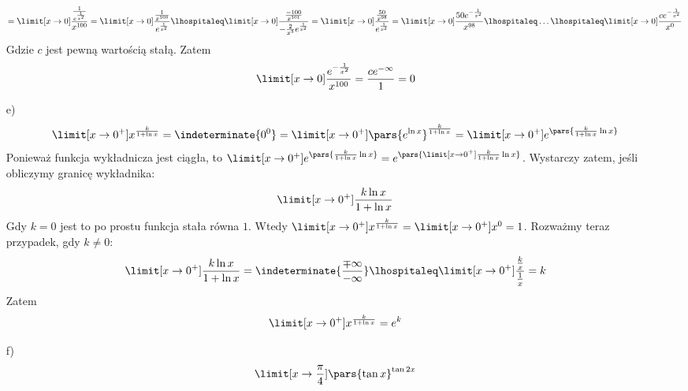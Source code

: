\begin{itemize}
\begin{equation*}
                = \limit[x \to 0] \frac{\frac{1}{e^{\frac{1}{x^2}}}}{x^{100}}
                = \limit[x \to 0] \frac{\frac{1}{x^{100}}}{e^{\frac{1}{x^2}}}
                \lhospitaleq \limit[x \to 0] \frac{\frac{-100}{x^{101}}}{-\frac{2}{x^3}e^{\frac{1}{x^2}}}
                = \limit[x \to 0] \frac{\frac{50}{x^{98}}}{e^{\frac{1}{x^2}}}
                = \limit[x \to 0] \frac{50e^{-\frac{1}{x^2}}}{x^{98}}
                \lhospitaleq \ldots
                \lhospitaleq \limit[x \to 0] \frac{ce^{-\frac{1}{x^2}}}{x^0}
        \end{equation*}
        Gdzie \(c\) jest pewną wartością stałą. Zatem
        \begin{equation*}
            \limit[x \to 0] \frac{e^{-\frac{1}{x^2}}}{x^{100}} = \frac{ce^{-\infty}}{1} = 0
        \end{equation*}
    \item[e)]
        \begin{equation*}
            \limit[x \to 0^+] x^{\frac{k}{1 + \ln x}}
                = \indeterminate{0^0}
                = \limit[x \to 0^+] \pars{e^{\ln x}}^{\frac{k}{1 + \ln x}}
                = \limit[x \to 0^+] e^{\pars{\frac{k}{1 + \ln x}\ln x}}
        \end{equation*}
        Ponieważ funkcja wykładnicza jest ciągła, to \(\limit[x \to 0^+] e^{\pars{\frac{k}{1 + \ln x}\ln x}} = e^{\pars{\limit[x \to 0^+] \frac{k}{1 + \ln x}\ln x}}\). Wystarczy zatem, jeśli obliczymy granicę wykładnika:
        \begin{equation*}
            \limit[x \to 0^+] \frac{k\ln x}{1 + \ln x}
        \end{equation*}
        Gdy \(k = 0\) jest to po prostu funkcja stała równa \(1\). Wtedy \(\limit[x \to 0^+] x^{\frac{k}{1 + \ln x}} = \limit[x \to 0^+] x^0 = 1\). Rozważmy teraz przypadek, gdy \(k \neq 0\):
        \begin{equation*}
            \limit[x \to 0^+] \frac{k\ln x}{1 + \ln x}
                = \indeterminate{\frac{\mp\infty}{-\infty}}
                \lhospitaleq \limit[x \to 0^+] \frac{\frac{k}{x}}{\frac{1}{x}}
                = k
        \end{equation*}
        Zatem
        \begin{equation*}
            \limit[x \to 0^+] x^{\frac{k}{1 + \ln x}} = e^k
        \end{equation*}
    \item[f)]
        \begin{equation*}
            \limit[x \to \frac{\pi}{4}] \pars{\tan x}^{\tan2x}

\end{equation*}
\end{itemize}
